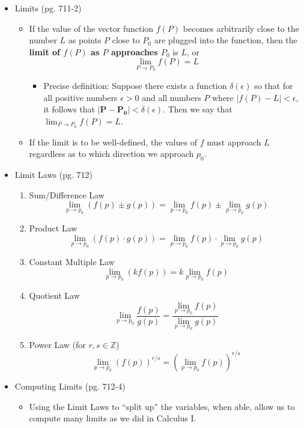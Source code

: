 \documentclass[12pt]{article}
\theoremstyle{plain}
\theoremstyle{definition}
\theoremstyle{remark}
\newcommand{\ds}{\displaystyle}
\newcommand{\vect}[1]{\mathbf{#1}}
\begin{document}
	\begin{itemize}
	
	\item Limits (pg. 711-2)
		\begin{itemize}
		\item If the value of the vector function $f(P)$ becomes arbitrarily close to the number $L$ as points $P$ close to $P_0$ are plugged into the function, then the \textbf{limit of $f(P)$ as $P$ approaches $P_0$} is $L$, or \[\lim_{P\to P_0} f(P) = L\]
			\begin{itemize}
			\item Precise definition: \newline
			Suppose there exists a function $\delta(\epsilon)$ so that for all positive numbers $\epsilon>0$ and all numbers $P$ where $|f(P)-L|<\epsilon$, it follows that $|\vect{P}-\vect{P_0}|<\delta(\epsilon)$. Then we say that $\lim_{P\to P_0} f(P) = L$.
			\end{itemize}
		\item If the limit is to be well-defined, the values of $f$ must approach $L$ regardless as to which direction we approach $p_0$.
		\end{itemize}
		
	\item Limit Laws (pg. 712)
	
			\begin{enumerate}
			\item Sum/Difference Law \[\lim_{p\to p_0}(f(p)\pm g(p)) = \lim_{p\to p_0}f(p) \pm \lim_{p\to p_0}g(p)\]
			\item Product Law \[\lim_{p\to p_0}(f(p)\cdot g(p)) = \lim_{p\to p_0}f(p) \cdot \lim_{p\to p_0}g(p)\]
			\item Constant Multiple Law \[\lim_{p\to p_0}(kf(p)) = k\lim_{p\to p_0}f(p)\]
			\item Quotient Law \[\lim_{p\to p_0}\frac{f(p)}{g(p)} = \frac{\ds \lim_{p\to p_0}f(p)}{\ds \lim_{p\to p_0}g(p)}\]
			\item Power Law (for $r,s\in \mathbb{Z}$) \[\lim_{p\to p_0}(f(p))^{r/s} = \left(\lim_{p\to p_0}f(p)\right)^{r/s}\]
			\end{enumerate}
					
	\item Computing Limits (pg. 712-4)
		
		\begin{itemize}
		
		\item Using the Limit Laws to ``split up'' the variables, when able, allow us to compute many limits as we did in Calculus I.
		

\end{itemize}
\end{itemize}
\end{document}
